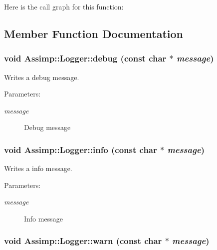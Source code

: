 Here is the call graph for this function:

\subsection{Member Function Documentation}
\hypertarget{class_assimp_1_1_logger_3b10454ab4c0949f251062376d9c4161}{
\subsubsection[debug]{\setlength{\rightskip}{0pt plus 5cm}void Assimp::Logger::debug (const char $\ast$ {\em message})}}
\label{class_assimp_1_1_logger_3b10454ab4c0949f251062376d9c4161}


Writes a debug message. 

\begin{Desc}
\item[Parameters:]
\begin{description}
\item[{\em message}]Debug message \end{description}
\end{Desc}
\hypertarget{class_assimp_1_1_logger_12b8a125083c47ac0bb6056f00761e52}{
\subsubsection[info]{\setlength{\rightskip}{0pt plus 5cm}void Assimp::Logger::info (const char $\ast$ {\em message})}}
\label{class_assimp_1_1_logger_12b8a125083c47ac0bb6056f00761e52}


Writes a info message. 

\begin{Desc}
\item[Parameters:]
\begin{description}
\item[{\em message}]Info message \end{description}
\end{Desc}
\hypertarget{class_assimp_1_1_logger_32bc5ee4b23df13551b83b925907f1b1}{
\subsubsection[warn]{\setlength{\rightskip}{0pt plus 5cm}void Assimp::Logger::warn (const char $\ast$ {\em message})}}
\label{class_assimp_1_1_logger_32bc5ee4b23df13551b83b925907f1b1}


